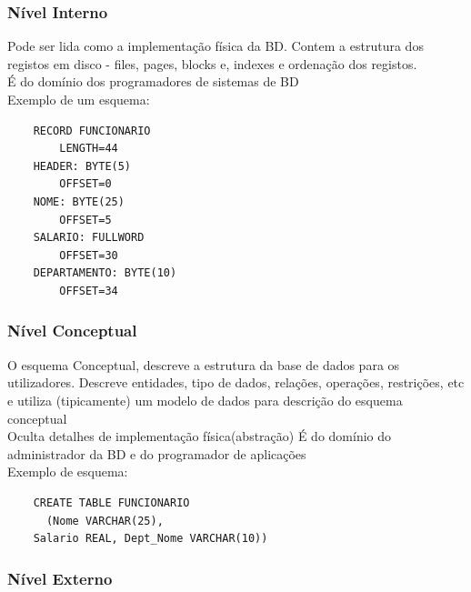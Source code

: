 \documentclass{easyclass}
\begin{document}
\subsubsection{Nível Interno}
Pode ser lida como a implementação física da BD. Contem a estrutura dos registos em disco - files, pages, blocks e, indexes e ordenação dos registos.\\
É do domínio dos programadores de sistemas de BD\\
Exemplo de um esquema: 
\begin{verbatim}
    RECORD FUNCIONARIO
        LENGTH=44
    HEADER: BYTE(5)
        OFFSET=0
    NOME: BYTE(25)
        OFFSET=5
    SALARIO: FULLWORD
        OFFSET=30
    DEPARTAMENTO: BYTE(10)
        OFFSET=34
\end{verbatim}
\subsubsection{Nível Conceptual}
O esquema Conceptual, descreve a estrutura da base de dados para os utilizadores. Descreve entidades, tipo de dados, relações, operações, restrições, etc e utiliza (tipicamente) um modelo de dados para descrição do esquema conceptual\\
Oculta detalhes de implementação física(abstração)
É do domínio do administrador da BD e do programador de aplicações\\
Exemplo de esquema:\\
\begin{verbatim}
    CREATE TABLE FUNCIONARIO
      (Nome VARCHAR(25), 
    Salario REAL, Dept_Nome VARCHAR(10))
\end{verbatim}
\subsubsection{Nível Externo}

%
\end{document}
